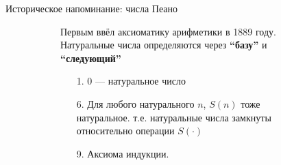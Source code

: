 \begin{frame}{Историческое напоминание: числа Пеано}
\begin{figure}[ht]
  \begin{subfigure}[t]{.55\textwidth}
  \vspace{-8em}
  Первым ввёл аксиоматику арифметики в 1889 году. Натуральные числа определяются через \textbf{\enquote{базу}} и \textbf{\enquote{следующий}}\\

  \begin{enumerate}
  \item[1.] 0 --- натуральное число
  \item[6.] Для любого натурального $n$, $S(n)$ тоже натуральное. т.е. натуральные числа замкнуты относительно операции $S(\cdot)$
  \item [9.] Аксиома индукции.
  \end{enumerate}


\end{subfigure}
\end{figure}
\end{frame}
